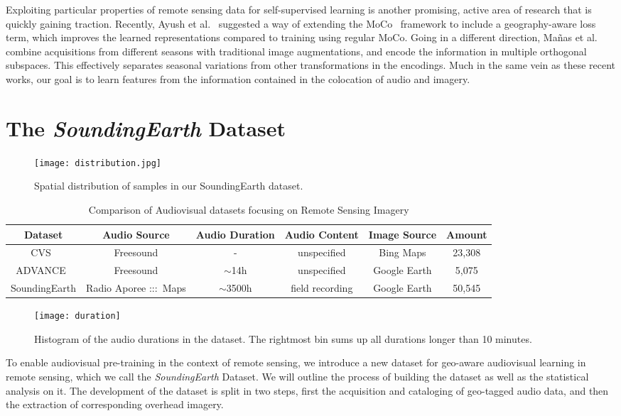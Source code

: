 \documentclass[journal]{IEEEtran}
\begin{document}
Exploiting particular properties of remote sensing data
for self-supervised learning
is another promising, active area of research
that is quickly gaining traction.
Recently, Ayush et al.~\cite{ayush_geography-aware_2020}
suggested a way of extending
the MoCo~\cite{he_momentum_2020} framework to include
a geography-aware loss term,
which improves the learned representations
compared to training using regular MoCo.
Going in a different direction, Ma\~nas et al.~\cite{manas_seasonal_2021}
combine acquisitions from different seasons with
traditional image augmentations,
and encode the information in multiple orthogonal subspaces.
This effectively separates seasonal variations from
other transformations in the encodings.
Much in the same vein as these recent works,
our goal is to learn features from the information contained in
the colocation of audio and imagery.

\section{The \emph{SoundingEarth} Dataset}\label{sect:dataset}
\begin{figure}
  \center
  \texttt{[image: distribution.jpg]}
  \caption{Spatial distribution of samples in
      our SoundingEarth dataset.
  }
  \label{fig:distribution}
\end{figure}

\begin{table*}[t]
  \centering
  \caption{Comparison of Audiovisual datasets focusing on Remote Sensing Imagery}
  \begin{tabular}{cccccc}
    \toprule[1pt]
    Dataset & Audio Source & Audio Duration & Audio Content & Image Source & Amount \\
    \midrule[1pt]
    CVS~\cite{salem2018multimodal}& Freesound & - & unspecified & Bing Maps & 23,308\\
    ADVANCE~\cite{hu_cross-task_2020}& Freesound & $\sim$14h& unspecified & Google Earth & 5,075\\
    SoundingEarth & Radio Aporee :::~Maps &  $\sim$3500h & field recording & Google Earth & 50,545\\
    \bottomrule[1pt]
  \end{tabular}
  \vspace{6pt}
  \label{tabel:compare}
\end{table*}
\begin{figure}
  \texttt{[image: duration]}
  \caption{Histogram of the audio durations in the dataset. The rightmost bin sums up all durations longer than 10 minutes.
  }
  \label{fig:duration}
\end{figure}
To enable audiovisual pre-training in the context of remote sensing,
we introduce a new dataset for geo-aware audiovisual learning in remote sensing, which we call the \emph{SoundingEarth} Dataset. We will outline the process of building the dataset as well as the statistical analysis on it. The development of the dataset is split in two steps, first the acquisition and cataloging of geo-tagged audio data, and then the extraction of corresponding overhead imagery.
\end{document}
